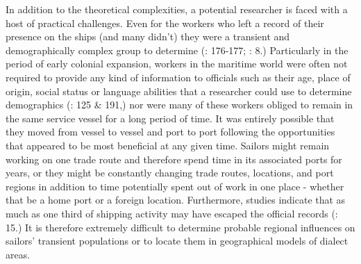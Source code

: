 \begin{styleNormali}
  In addition to the theoretical complexities, a potential researcher is faced with a host of practical challenges. Even for the workers who left a record of their presence on the ships (and many didn’t) they were a transient and demographically complex group to determine (\citealt{AdkinsAdkins2008}: 176-177; \citealt{Fusaro2015}: 8.) Particularly in the period of early colonial expansion, workers in the maritime world were often not required to provide any kind of information to officials such as their age, place of origin, social status or language abilities that a researcher could use to determine demographics (\citealt{Litter1999}: 125 \& 191,) nor were many of these workers obliged to remain in the same service vessel for a long period of time. It was entirely possible that they moved from vessel to vessel and port to port following the opportunities that appeared to be most beneficial at any given time. Sailors might remain working on one trade route and therefore spend time in its associated ports for years, or they might be constantly changing trade routes, locations, and port regions in addition to time potentially spent out of work in one place - whether that be a home port or a foreign location. Furthermore, studies indicate that as much as one third of shipping activity may have escaped the official records (\citealt{Cook2005}: 15.) It is therefore extremely difficult to determine probable regional influences on sailors’ transient populations or to locate them in geographical models of dialect areas.
\end{styleNormali}

